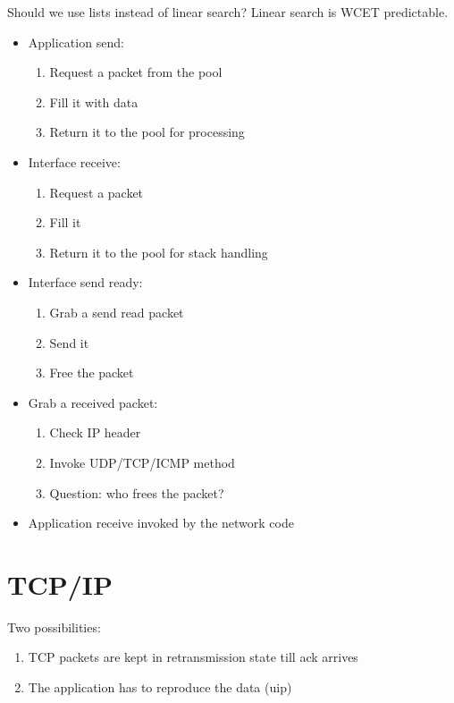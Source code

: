 Should we use lists instead of linear search? Linear
    search is WCET predictable.

\begin{itemize}
    \item Application send:
    \begin{enumerate}
        \item Request a packet from the pool
        \item Fill it with data
        \item Return it to the pool for processing
    \end{enumerate}
    \item Interface receive:
    \begin{enumerate}
        \item Request a packet
        \item Fill it
        \item Return it to the pool for stack handling
    \end{enumerate}
    \item Interface send ready:
    \begin{enumerate}
        \item Grab a send read packet
        \item Send it
        \item Free the packet
    \end{enumerate}
    \item Grab a received packet:
    \begin{enumerate}
        \item Check IP header
        \item Invoke UDP/TCP/ICMP method
        \item Question: who frees the packet?
    \end{enumerate}
    \item Application receive invoked by the network code
\end{itemize}

\section{TCP/IP}

Two possibilities:
\begin{enumerate}
    \item TCP packets are kept in retransmission state till ack
    arrives
    \item The application has to reproduce the data (uip)
\end{enumerate}

